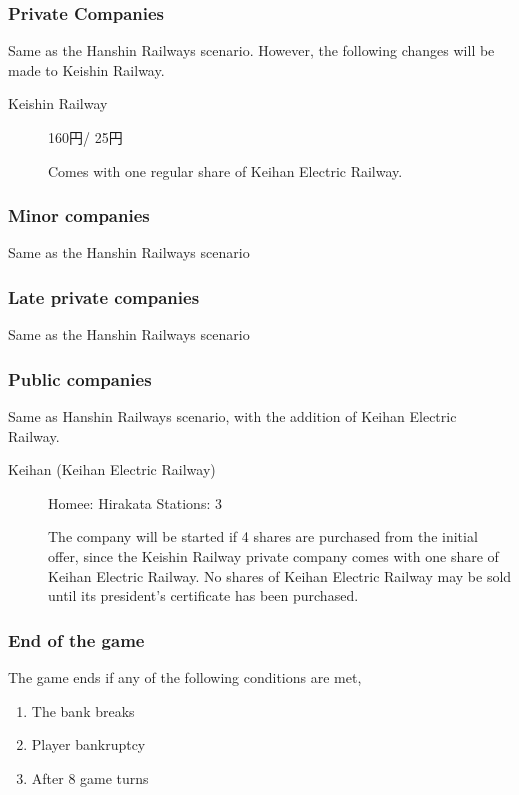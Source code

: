 \begin{multicols}{2}
\subsubsection{Private Companies}

Same as the Hanshin Railways scenario. However, the following changes will
be made to Keishin Railway.

\begin{description}
\item[Keishin Railway]  160円/ 25円

Comes with one regular share of Keihan Electric Railway.
\end{description}

\subsubsection{Minor companies}
Same as the Hanshin Railways scenario

\subsubsection{Late private companies}
Same as the Hanshin Railways scenario

\subsubsection{Public companies}
Same as Hanshin Railways scenario, with the addition of Keihan Electric Railway.

\begin{description}
\item[Keihan (Keihan Electric Railway)] \hfill

Homee: Hirakata \hfill Stations: 3

The company will be started if 4 shares are purchased from the initial
offer, since the Keishin Railway private company comes with one share of
Keihan Electric Railway. No shares of Keihan Electric Railway may be
sold until its president's certificate has been purchased.
\end{description}

\subsubsection{End of the game}
The game ends if any of the following conditions are met,
\begin{enumerate}
\item The bank breaks
\item Player bankruptcy
\item After 8 game turns
\end{enumerate}


\end{multicols}
